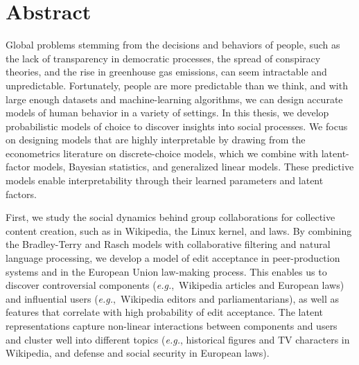\cleardoublepage
\chapter*{Abstract}

Global problems stemming from the decisions and behaviors of people, such as the lack of transparency in democratic processes, the spread of conspiracy theories, and the rise in greenhouse gas emissions, can seem intractable and unpredictable.
Fortunately, people are more predictable than we think, and with large enough datasets and machine-learning algorithms, we can design accurate models of human behavior in a variety of settings.
In this thesis, we develop probabilistic models of choice to discover insights into social processes.
We focus on designing models that are highly interpretable by drawing from the econometrics literature on discrete-choice models, which we combine with latent-factor models, Bayesian statistics, and generalized linear models.
These predictive models enable interpretability through their learned parameters and latent factors.

First, we study the social dynamics behind group collaborations for collective content creation, such as in Wikipedia, the Linux kernel, and laws.
By combining the Bradley-Terry and Rasch models with collaborative filtering and natural language processing, we develop a model of edit acceptance in peer-production systems and in the European Union law-making process.
This enables us to discover controversial components (\textit{e.g.},~Wikipedia articles and European laws) and influential users (\textit{e.g.},~Wikipedia editors and parliamentarians), as well as features that correlate with high probability of edit acceptance.
The latent representations capture non-linear interactions between components and users and cluster well into different topics (\textit{e.g.}, historical figures and TV characters in Wikipedia, and defense and social security in European laws).

